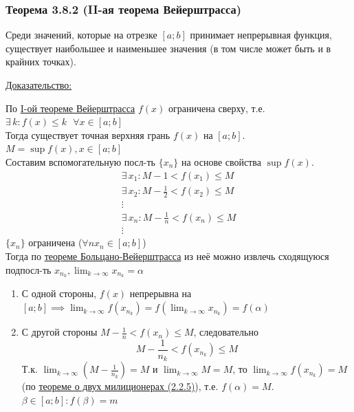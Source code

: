 \documentclass[12pt]{article}
\def\posl#1#2{\{#1_{#2}\}}
\begin{document}
    \subsubsection*{Теорема 3.8.2 (II-ая теорема Вейерштрасса)}\label{th:3.8.2}
    Среди значений, которые на отрезке $[a; b]$ принимает непрерывная функция, существует наибольшее и наименьшее значения (в том числе может быть и в крайних точках).\par\noindent
    \underline{Доказательство:}
    \begin{adjustwidth}{1.5em}{1.5em}
        По \hyperref[th:3.8.1]{I-ой теореме Вейерштрасса} $f(x)$ ограничена сверху, т.е. $\exists\,k : f(x) \le k \text{ }  \forall x \in [a; b]$\\
        Тогда существует точная верхняя грань $f(x)$ на $[a; b]$. $M = \sup f(x), x \in [a; b]$\\
        Составим вспомогательную посл-ть $\posl{x}{n}$ на основе свойства $\sup f(x)$.
        \begin{gather*}
            \exists\,x_1 : M - 1 < f(x_1) \le M\\
            \exists\,x_2 : M - \frac{1}{2} < f(x_2) \le M\\
            \vdots\\
            \exists\,x_n : M - \frac{1}{n} < f(x_n) \le M\\
            \vdots
        \end{gather*}
        $\posl{x}{n}$ ограничена ($\forall n x_n \in [a; b]$)\\
        Тогда по \hyperref[th:2.8.1]{теореме Больцано-Вейерштрасса} из неё можно извлечь сходящуюся подпосл-ть $x_{n_k}, \lim_{k\to\infty}x_{n_k} = \alpha$
        \begin{enumerate}
            \item С одной стороны, $f(x)$ непрерывна на $[a; b] \implies \lim_{k\to\infty}f(x_{n_k}) = f(\lim_{k\to\infty}x_{n_k}) = f(\alpha)$
            \item С другой стороны $M - \frac{1}{n} < f(x_n) \le M$, следовательно
            \[
                M - \frac{1}{n_k} < f(x_{n_k}) \le M
            \]
            Т.к. $\lim_{k\to\infty} (M - \frac{1}{n_k}) = M$ и $\lim_{k\to\infty} M = M$, то $\lim_{k\to\infty}f(x_{n_k}) = M$ (по \hyperref[th:2.2.5]{теореме о двух милиционерах (2.2.5)}), т.е. $f(\alpha) = M$.\\
            $\beta \in [a; b] : f(\beta) = m$
        \end{enumerate}
    \end{adjustwidth}
\end{document}
